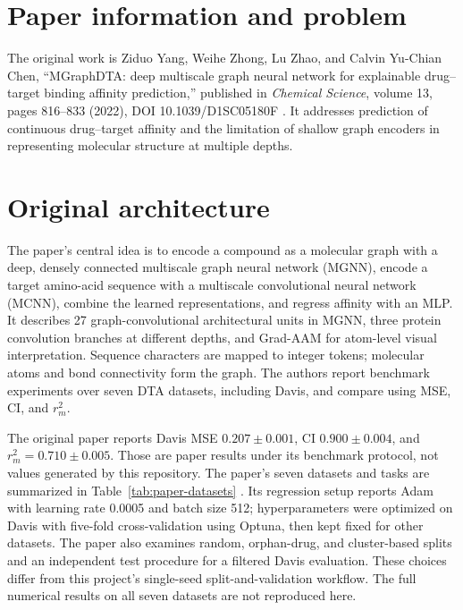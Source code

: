 \section{Paper information and problem}
The original work is Ziduo Yang, Weihe Zhong, Lu Zhao, and Calvin Yu-Chian Chen, ``MGraphDTA: deep multiscale graph neural network for explainable drug--target binding affinity prediction,'' published in \emph{Chemical Science}, volume 13, pages 816--833 (2022), DOI 10.1039/D1SC05180F \cite{yang2022mgraphdta}. It addresses prediction of continuous drug--target affinity and the limitation of shallow graph encoders in representing molecular structure at multiple depths.

\section{Original architecture}
The paper's central idea is to encode a compound as a molecular graph with a deep, densely connected multiscale graph neural network (MGNN), encode a target amino-acid sequence with a multiscale convolutional neural network (MCNN), combine the learned representations, and regress affinity with an MLP. It describes 27 graph-convolutional architectural units in MGNN, three protein convolution branches at different depths, and Grad-AAM for atom-level visual interpretation. Sequence characters are mapped to integer tokens; molecular atoms and bond connectivity form the graph. The authors report benchmark experiments over seven DTA datasets, including Davis, and compare using MSE, CI, and $r_m^2$.

The original paper reports Davis MSE $0.207\pm0.001$, CI $0.900\pm0.004$, and $r_m^2=0.710\pm0.005$. Those are paper results under its benchmark protocol, not values generated by this repository. The paper's seven datasets and tasks are summarized in Table~\ref{tab:paper-datasets} \cite{yang2022mgraphdta}. Its regression setup reports Adam with learning rate 0.0005 and batch size 512; hyperparameters were optimized on Davis with five-fold cross-validation using Optuna, then kept fixed for other datasets. The paper also examines random, orphan-drug, and cluster-based splits and an independent test procedure for a filtered Davis evaluation. These choices differ from this project's single-seed split-and-validation workflow. The full numerical results on all seven datasets are not reproduced here.

